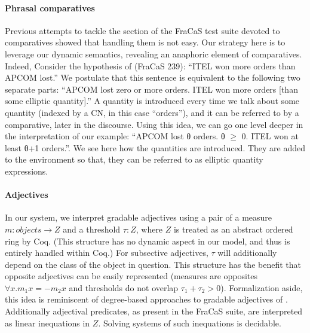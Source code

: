 \documentclass[11pt]{article}
\begin{document}
\paragraph{Phrasal comparatives}
Previous attempts to tackle the section of the FraCaS test suite
devoted to comparatives showed that handling them is not easy. Our
strategy here is to leverage our dynamic semantics, revealing an
anaphoric element of comparatives. Indeed, Consider the hypothesis of
(FraCaS 239): ``ITEL won more orders than APCOM lost.''  We postulate
that this sentence is equivalent to the following two separate parts:
``APCOM lost zero or more orders. ITEL won more orders [than some
elliptic quantity].''  A quantity is introduced every time we talk
about some quantity (indexed by a CN, in this case ``orders''), and it
can be referred to by a comparative, later in the discourse. Using
this idea, we can go one level deeper in the interpretation of our
example: ``APCOM lost θ orders. θ $\ge$ 0.  ITEL won at least θ+1
orders.''. We see here how the quantities are introduced. They are
added to the environment so that, they can be referred to as elliptic
quantity expressions.


\paragraph{Adjectives}
In our system, we interpret gradable adjectives using a pair of a
measure $m : objects → Z$ and a threshold $τ : Z$, where $Z$ is
treated as an abstract ordered ring by Coq. (This structure has no
dynamic aspect in our model, and thus is entirely handled within Coq.)
For subsective adjectives, $τ$ will additionally depend on the class
of the object in question. This structure has the benefit that
opposite adjectives can be easily represented (measures are opposites
$∀x. m_1 x = -m_2 x$ and thresholds do not overlap $τ_1 + τ_2 >
0$). Formalization aside, this idea is reminiscent of degree-based
approaches to gradable adjectives of
\citet{Cresswell:1976,Kennedy:2007}.  Additionally
adjectival predicates, as present in the FraCaS suite, are interpreted as
linear inequations in $Z$. Solving systems of such inequations is
decidable.


\end{document}
